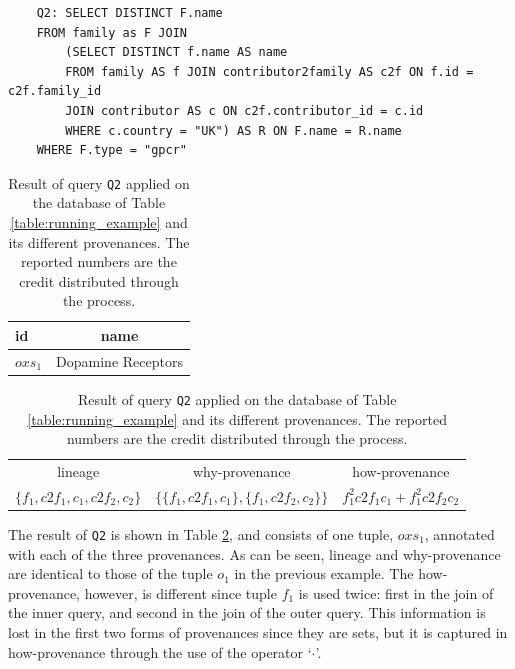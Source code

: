 \vspace{2mm}
{\footnotesize
\begin{adjustwidth}{25pt}{5pt}
\begin{verbatim}
	Q2: SELECT DISTINCT F.name 
	FROM family as F JOIN
		(SELECT DISTINCT f.name AS name
		FROM family AS f JOIN contributor2family AS c2f ON f.id = c2f.family_id
		JOIN contributor AS c ON c2f.contributor_id = c.id
		WHERE c.country = "UK") AS R ON F.name = R.name
	WHERE F.type = "gpcr"
\end{verbatim}	
\end{adjustwidth}
}
\vspace{2mm}

\begin{table}[]
\centering
  \begin{tabular}{|l||c|}
  \hline
    id & name\\
    \hline
    $oxs_1$ &  Dopamine Receptors\\
    \hline
  \end{tabular}
  \newline
\vspace{2mm}
  \begin{tabular}{c | c | c}
  	lineage & why-provenance & how-provenance   \\
  	$\{f_1, c2f_1, c_1, c2f_2, c_2\}$ & $\{\{f_1, c2f_1, c_1\}, \{f_1, c2f_2, c_2\}\}$ & $f_1^2 c2f_1 c_1 + f_1^2 c2f_2 c_2$\\
  \end{tabular}
    \caption{Result of query \texttt{Q2} applied on the database of Table \ref{table:running_example} and its different provenances. The reported numbers are the credit distributed through the process.}
  \label{table:difference_result}
\end{table}

The result of \texttt{Q2} is shown in Table \ref{table:difference_result}, and consists of one tuple, $oxs_1$, annotated with each of the three provenances. As can be seen, lineage and why-provenance are identical to those of the tuple $o_1$ in the previous example. 
The how-provenance, however, is different since tuple $f_1$ is used twice: first in the join of the inner query, and second in the join of the outer query. This information is lost in the first two forms of provenances since they are sets, but it is captured in how-provenance through the use of the operator `$\cdot$'.



